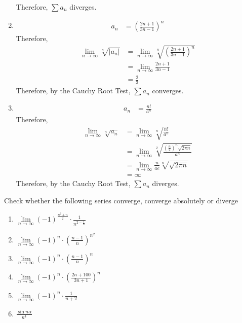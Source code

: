 \documentclass[fleqn, a4paper, 12pt, oneside]{amsart}
\theoremstyle{definition}
\theoremstyle{theorem}
\begin{document}
\begin{solution}
\begin{enumerate}[label=(\alph*), leftmargin=*]
			Therefore, $\sum a_n$ diverges.
		\item
			\begin{align*}
				a_n & = \left( \frac{2 n + 1}{3 n - 1} \right)^n
			\end{align*}
			Therefore,
			\begin{align*}
				\lim\limits_{n \to \infty} \sqrt[n]{|a_n|} & = \lim\limits_{n \to \infty} \sqrt[n]{\left( \frac{2 n + 1}{3 n - 1} \right)^n} \\
                                                                           & = \lim\limits_{n \to \infty} \frac{2 n + 1}{3 n - 1}                            \\
                                                                           & = \frac{2}{3}
			\end{align*}
			Therefore, by the Cauchy Root Test, $\sum a_n$ converges.
		\item
			\begin{align*}
				a_n & = \frac{n!}{a^n}
			\end{align*}
			Therefore,
			\begin{align*}
				\lim\limits_{n \to \infty} \sqrt[n]{a_n} & = \lim\limits_{n \to \infty} \sqrt[n]{\frac{n!}{a^n}}                                          \\
                                                                         & = \lim\limits_{n \to \infty} \sqrt[2]{\frac{\left( \frac{n}{2} \right)^n \sqrt{2 \pi n}}{a^n}} \\
                                                                         & = \lim\limits_{n \to \infty} \frac{n}{a e} \sqrt[n]{\sqrt{2 \pi n}}                            \\
                                                                         & = \infty
			\end{align*}
			Therefore, by the Cauchy Root Test, $\sum a_n$ diverges.
	\end{enumerate}
\end{solution}

\begin{question}
	Check whether the following series converge, converge absolutely or diverge
	\begin{enumerate}[label=(\alph*)]
		\item $\lim\limits_{n \to \infty} (-1)^{\frac{n^2 + n}{2}} \cdot \frac{1}{n^{2 - \frac{1}{n}}}$
		\item $\lim\limits_{n \to \infty} (-1)^n \cdot \left( \frac{n - 1}{n} \right)^{n^2}$
		\item $\lim\limits_{n \to \infty} (-1)^n \cdot \left( \frac{n - 1}{n} \right)^n$
		\item $\lim\limits_{n \to \infty} (-1)^n \cdot \left( \frac{2 n + 100}{3 n + 1} \right)^n$
		\item $\lim\limits_{n \to \infty} (-1)^n \cdot \frac{1}{n + 2}$
		\item $\frac{\sin n \alpha}{n^4}$
	\end{enumerate}
\end{question}
\end{document}
